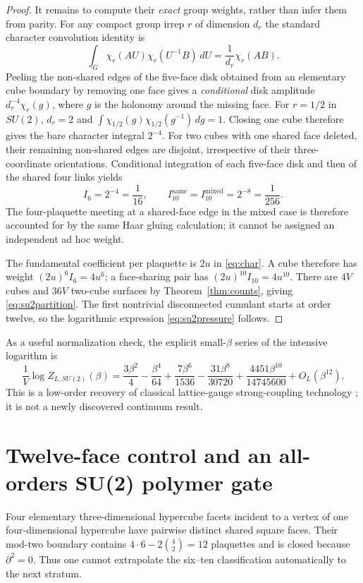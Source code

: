 \documentclass[11pt,a4paper]{article}
\begin{document}
\begin{proof}
It remains to compute their \emph{exact} group weights, rather than
infer them from parity. For any compact group irrep $r$ of dimension
$d_r$ the standard character convolution identity is
\[
\int_G\chi_r(AU)\chi_r(U^{-1}B)\,dU
=\frac1{d_r}\chi_r(AB).
\]
Peeling the non-shared edges of the five-face disk obtained from
an elementary cube boundary by removing one face gives a
\emph{conditional} disk amplitude $d_r^{-4}\chi_r(g)$,
where $g$ is the holonomy around the missing face.
For $r=1/2$ in $SU(2)$, $d_r=2$ and
$\int\chi_{1/2}(g)\chi_{1/2}(g^{-1})\,dg=1$. Closing one
cube therefore gives the bare character integral $2^{-4}$.
For two cubes with one shared face deleted, their remaining
non-shared edges are disjoint, irrespective of their
three-coordinate orientations. Conditional integration of each
five-face disk and then of the shared four links yields
\begin{equation}\label{eq:groupweights}
I_6=2^{-4}=\frac1{16},\qquad
I_{10}^{\mathrm{same}}=I_{10}^{\mathrm{mixed}}
 =2^{-8}=\frac1{256}.
\end{equation}
The four-plaquette meeting at a shared-face edge in the mixed
case is therefore accounted for by the same Haar gluing
calculation; it cannot be assigned an independent ad hoc weight.

The fundamental coefficient per plaquette is $2u$ in
\eqref{eq:char}. A cube therefore has weight
$(2u)^6I_6=4u^6$; a face-sharing pair has
$(2u)^{10}I_{10}=4u^{10}$. There are $4V$ cubes
and $36V$ two-cube surfaces by Theorem~\ref{thm:counts},
giving \eqref{eq:su2partition}. The first nontrivial
disconnected cumulant starts at order twelve, so the
logarithmic expression \eqref{eq:su2pressure} follows.
\end{proof}

As a useful normalization check, the explicit small-$\beta$ series
of the intensive logarithm is
\begin{equation}\label{eq:beta-pressure}
\frac1V\log Z_{L,SU(2)}(\beta)
=\frac{3\beta^2}{4}-\frac{\beta^4}{64}
+\frac{7\beta^6}{1536}-\frac{31\beta^8}{30720}
+\frac{4451\beta^{10}}{14745600}+O_L(\beta^{12}).
\end{equation}
This is a low-order recovery of classical lattice-gauge
strong-coupling technology \cite{drouffe,kogut}; it is not
a newly discovered continuum result.

\section{Twelve-face control and an all-orders SU(2) polymer gate}
Four elementary three-dimensional hypercube facets incident to a vertex of one four-dimensional hypercube have pairwise distinct shared square faces. Their mod-two boundary contains \(4\cdot6-2\binom42=12\) plaquettes and is closed because \(\partial^2=0\). Thus one cannot extrapolate the six--ten classification automatically to the next stratum.
\end{document}
